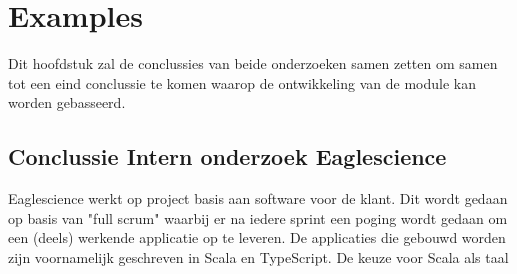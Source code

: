 
\chapter{Examples} %

\label{ch:examples} %


Dit hoofdstuk zal de conclussies van beide onderzoeken samen zetten om samen tot een eind conclussie te komen waarop de ontwikkeling van de module kan worden gebasseerd.


\section{Conclussie Intern onderzoek Eaglescience}
Eaglescience werkt op project basis aan software voor de klant. Dit wordt gedaan op basis van "full scrum" waarbij er na iedere sprint een poging wordt gedaan om een (deels) werkende applicatie op te leveren. De applicaties die gebouwd worden zijn voornamelijk geschreven in Scala en TypeScript. De keuze voor Scala als taal
